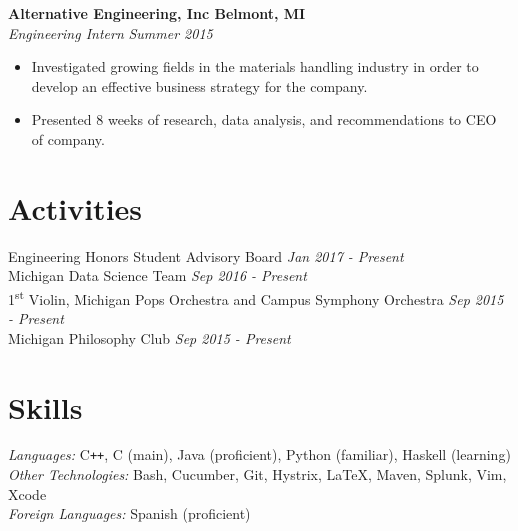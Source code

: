 \documentclass[margin,line]{resume}
\begin{document}
\begin{resume}
    \vspace{-2.5mm}
    \textbf{Alternative Engineering, Inc \hfill Belmont, MI} \\\vspace{1mm}%
    \textsl{Engineering Intern} \hfill \textsl{Summer 2015}
    \begin{itemize}
    \item Investigated growing fields in the materials handling industry in order to develop an effective business strategy for the company. 
    \item Presented 8 weeks of research, data analysis, and recommendations to CEO of company.
    \end{itemize}
    \vspace{2.5mm}

   \sectionbreak
   \vspace{-2.5mm}
   \section{\mysidestyle Activities}
   \begin{flushright}
   \vspace{-7.5mm}
    Engineering Honors Student Advisory Board	\hfill  \textsl{Jan 2017 - Present} \\
    Michigan Data Science Team \hfill \textsl{Sep 2016 - Present}\\
    1\textsuperscript{st} Violin, Michigan Pops Orchestra and Campus Symphony Orchestra \hfill \textsl{Sep 2015 - Present}\\
    Michigan Philosophy Club \hfill \textsl{Sep 2015 - Present}
    \end{flushright}
    \vspace{-1.5mm}
    
    \sectionbreak
    \vspace{-2.5mm}
    \section{\mysidestyle Skills}
    \emph{Languages:} C\texttt{++}, C (main), Java (proficient), Python (familiar), Haskell (learning) \\
    \emph{Other Technologies:} Bash, Cucumber, Git, Hystrix, \LaTeX, Maven, Splunk, Vim, Xcode \\
    \emph{Foreign Languages:} Spanish (proficient)
\end{resume}
\end{document}

